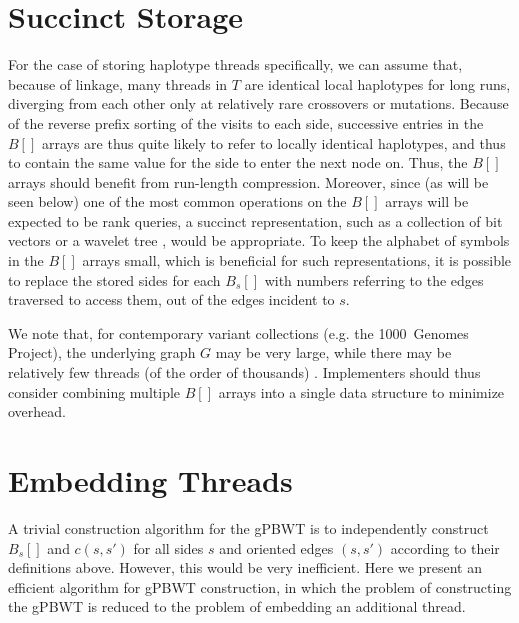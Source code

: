\section{Succinct Storage}

For the case of storing haplotype threads specifically, we can assume that, because of linkage, many threads in $T$ are identical local haplotypes for long runs, diverging from each other only at relatively rare crossovers or mutations. Because of the reverse prefix sorting of the visits to each side, successive entries in the $B[]$ arrays are thus quite likely to refer to locally identical haplotypes, and thus to contain the same value for the side to enter the next node on. Thus, the $B[]$ arrays should benefit from run-length compression. Moreover, since (as will be seen below) one of the most common operations on the $B[]$ arrays will be expected to be rank queries, a succinct representation, such as a collection of bit vectors or a wavelet tree \cite{grossi2003high}, would be appropriate. To keep the alphabet of symbols in the $B[]$ arrays small, which is beneficial for such representations, it is possible to replace the stored sides for each $B_s[]$ with numbers referring to the edges traversed to access them, out of the edges incident to $s$.

We note that, for contemporary variant collections (e.g. the 1000~Genomes Project), the underlying graph $G$ may be very large, while there may be relatively few threads (of the order of thousands) \cite{10002015global}. Implementers should thus consider combining multiple $B[]$ arrays into a single data structure to minimize overhead.

\section{Embedding Threads}

A trivial construction algorithm for the gPBWT is to independently construct $B_s[]$ and $c(s, s')$ for all sides $s$ and oriented edges $(s, s')$ according to their definitions above. However, this would be very inefficient. Here we present an efficient algorithm for gPBWT construction, in which the problem of constructing the gPBWT is reduced to the problem of embedding an additional thread.

